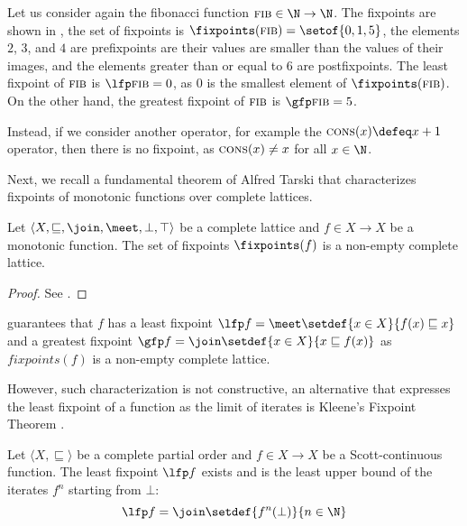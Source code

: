 \begin{example}
  Let us consider again the fibonacci function $\textsc{fib} \in \N \to \N$. The fixpoints are shown in , the set of fixpoints is $\fixpoints(\textsc{fib}) = \setof{0, 1, 5}$, the elements $2$, $3$, and $4$ are prefixpoints are their values are smaller than the values of their images, and the elements greater than or equal to $6$ are postfixpoints.
  The least fixpoint of $\textsc{fib}$ is $\lfp \textsc{fib} = 0$, as $0$ is the smallest element of $\fixpoints(\textsc{fib})$.
  On the other hand, the greatest fixpoint of $\textsc{fib}$ is $\gfp \textsc{fib} = 5$.

  Instead, if we consider another operator, for example the $\textsc{cons}(x) \defeq x + 1$ operator, then there is no fixpoint, as $\textsc{cons}(x) \neq x$ for all $x \in \N$.
\end{example}

Next, we recall a fundamental theorem of Alfred Tarski  that characterizes fixpoints of monotonic functions over complete lattices.

\begin{theorem}
  Let $\langle X, \sqsubseteq, \join, \meet, \bot, \top \rangle$ be a complete lattice and $f \in X \to X$ be a monotonic function. The set of fixpoints $\fixpoints(f)$ is a non-empty complete lattice.
\end{theorem}
\begin{proof}
  See \textcite{Tarsky1955}.
\end{proof}
 guarantees that $f$ has a least fixpoint $\lfp f = \meet \setdef{x \in X}{f(x) \sqsubseteq x}$ and a greatest fixpoint $\gfp f = \join \setdef{x \in X}{x \sqsubseteq f(x)}$ as $fixpoints(f)$ is a non-empty complete lattice.

However, such characterization is not constructive, an alternative that expresses the least fixpoint of a function as the limit of iterates is Kleene's Fixpoint Theorem .


\begin{theorem}
  Let $\langle X, \sqsubseteq \rangle$ be a complete partial order and $f \in X \to X$ be a Scott-continuous function. The least fixpoint $\lfp f$ exists and is the least upper bound of the iterates $f^n$ starting from $\bot$:
  \[ \lfp f = \join \setdef{f^n(\bot)}{n \in \N} \]
\end{theorem}

